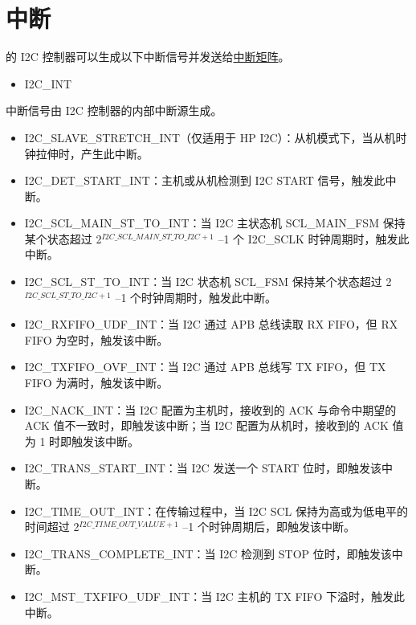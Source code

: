 \documentclass[main\_\_CN.tex]{subfiles}
\begin{document}
\section{中断}\label{sub:i2c-int}

\chipname{} 的 I2C 控制器可以生成以下中断信号并发送给\hyperref[mod:intmtrx]{中断矩阵}。

    \begin{itemize}
        \item I2C\_INT
    \end{itemize}

中断信号由 I2C 控制器的内部中断源生成。


\begin{itemize}
\item \label{int:i2c-slave-stretch}I2C\_SLAVE\_STRETCH\_INT（仅适用于 HP I2C）：从机模式下，当从机时钟拉伸时，产生此中断。
\item \label{int:i2c-start}I2C\_DET\_START\_INT：主机或从机检测到 I2C START 信号，触发此中断。
\item \label{int:i2c-scl-main-fsm}I2C\_SCL\_MAIN\_ST\_TO\_INT：当 I2C 主状态机 SCL\_MAIN\_FSM 保持某个状态超过 2$^{ \hyperref[fielddesc:I2CSCLMAINSTTOI2C]{I2C\_SCL\_MAIN\_ST\_TO\_I2C} +1}$ –1 个 I2C\_SCLK 时钟周期时，触发此中断。
\item \label{int:i2c-scl-fsm}I2C\_SCL\_ST\_TO\_INT：当 I2C 状态机 SCL\_FSM 保持某个状态超过 2$^{\hyperref[fielddesc:I2CSCLSTTOI2C]{I2C\_SCL\_ST\_TO\_I2C} +1}$ –1 个时钟周期时，触发此中断。
\item \label{int:i2c-rxfifo-udf}I2C\_RXFIFO\_UDF\_INT：当 I2C 通过 APB 总线读取 RX FIFO，但 RX FIFO 为空时，触发该中断。
\item \label{int:i2c-txfifo-ovf}I2C\_TXFIFO\_OVF\_INT：当 I2C 通过 APB 总线写 TX FIFO，但 TX FIFO 为满时，触发该中断。
\item \label{int:i2c-nack}I2C\_NACK\_INT：当 I2C 配置为主机时，接收到的 ACK 与命令中期望的 ACK 值不一致时，即触发该中断；当 I2C 配置为从机时，接收到的 ACK 值为 1 时即触发该中断。
\item \label{int:i2c-trans-start}I2C\_TRANS\_START\_INT：当 I2C 发送一个 START 位时，即触发该中断。
\item \label{int:i2c-time-out}I2C\_TIME\_OUT\_INT：在传输过程中，当 I2C SCL 保持为高或为低电平的时间超过 2$^{\hyperref[fielddesc:I2CTIMEOUTVALUE]{I2C\_TIME\_OUT\_VALUE}+1}$ –1 个时钟周期后，即触发该中断。
\item \label{int:i2c-trans-complete}I2C\_TRANS\_COMPLETE\_INT：当 I2C 检测到 STOP 位时，即触发该中断。
\item \label{int:i2c-mst-txfifo-udf}I2C\_MST\_TXFIFO\_UDF\_INT：当 I2C 主机的 TX FIFO 下溢时，触发此中断。

\end{itemize}
\end{document}
